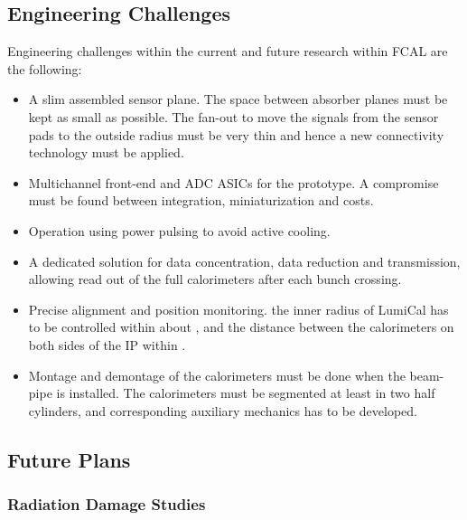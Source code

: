 \subsection{Engineering Challenges}
Engineering challenges within the current and future research within FCAL are the following:
\begin{itemize}
\item{A slim assembled sensor plane. The space between absorber planes must be kept as small
as possible. The fan-out to move the signals from the sensor pads to the outside radius must be very thin and
hence a new connectivity technology must be applied.}
\item{Multichannel front-end and ADC ASICs for the prototype.
A compromise must be found between integration, miniaturization and costs}.
\item{Operation using power pulsing to avoid active cooling}.
\item{A dedicated solution for data concentration, data reduction and transmission, allowing read out of
the full calorimeters after each bunch crossing}.
\item{Precise alignment and position monitoring. the inner radius of LumiCal has to be controlled within about \unit[10]{\micron}, and the distance between the
calorimeters on both sides of the IP within \unit[100]{\micron}}.
\item{Montage and demontage of the calorimeters must be done when the beam-pipe is installed. The calorimeters must be segmented at
least in two half cylinders, and corresponding auxiliary mechanics has to be developed.}
\end{itemize}

\subsection{Future Plans}

\subsubsection{Radiation Damage Studies}

